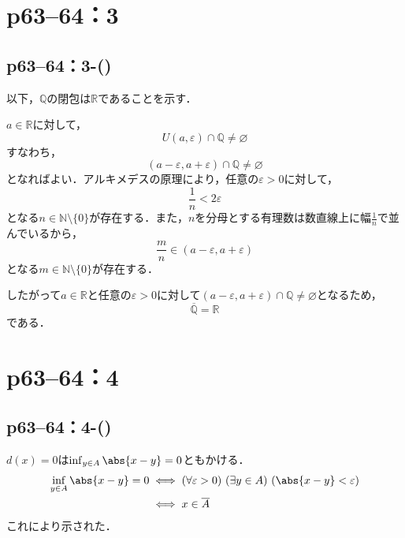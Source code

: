 \section*{p63--64：3}


\subsection*{p63--64：3-()}

\begin{tanswer}
    以下，$\mathbb{Q}$の閉包は$\mathbb{R}$であることを示す．

    $a \in \mathbb{R}$に対して，
    \[
        U(a,\varepsilon) \cap \mathbb{Q} \ne \varnothing
    \]
    すなわち，
    \[
        (a-\varepsilon,a+\varepsilon) \cap \mathbb{Q} \ne \varnothing
    \]
    となればよい．アルキメデスの原理により，任意の$\varepsilon >0$に対して，
    \[
        \frac{1}{n}< 2\varepsilon
    \]
    となる$n \in \mathbb{N} \setminus \{0\}$が存在する．また，$n$を分母とする有理数は数直線上に幅$\frac{1}{n}$で並んでいるから，
    \[
        \frac{m}{n} \in (a-\varepsilon,a+\varepsilon)
    \]
    となる$ m \in \mathbb{N} \setminus \{0\}$が存在する．\par
    したがって$a \in \mathbb{R}$と任意の$\varepsilon>0$に対して$(a-\varepsilon,a+\varepsilon) \cap \mathbb{Q} \ne \varnothing$となるため，
    \[
        \overline{\mathbb{Q}}=\mathbb{R}
    \]
    である．
\end{tanswer}


\section*{p63--64：4}


\subsection*{p63--64：4-()}

\begin{tproof}
    $d(x)=0$は$\inf_{y \in A} \abs{x-y} =0$ともかける．
    \begin{align*}
        \inf_{y \in A} \abs{x-y} =0 & \iff (\forall \varepsilon>0) \ (\exists y \in A)\ ( \abs{x-y}<\varepsilon ) \\
                                    & \iff x \in \overline{A}
    \end{align*}
    これにより示された．
\end{tproof}


